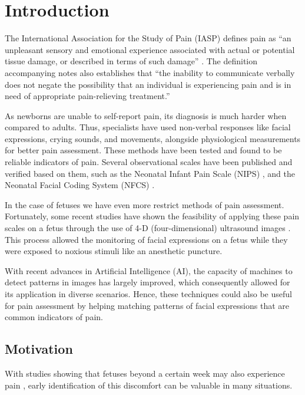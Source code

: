 \chapter{Introduction}

The International Association for the Study of Pain (IASP) defines pain as ``an unpleasant sensory and emotional experience associated with actual or potential tissue damage, or described in terms of such damage'' \citep{merskey1994classification}. The definition accompanying notes also establishes that ``the inability to communicate verbally does not negate the possibility that an individual is experiencing pain and is in need of appropriate pain-relieving treatment.''

As newborns are unable to self-report pain, its diagnosis is much harder when compared to adults. Thus, specialists have used non-verbal responses like facial expressions, crying sounds, and movements, alongside physiological measurements for better pain assessment. These methods have been tested and found to be reliable indicators of pain. Several observational scales have been published and verified based on them, such as the Neonatal Infant Pain Scale (NIPS) \citep{Lawrence1993}, and the Neonatal Facial Coding System (NFCS) \citep{Grunau1998}.

In the case of fetuses we have even more restrict methods of pain assessment. Fortunately, some recent studies have shown the feasibility of applying these pain scales on a fetus through the use of 4-D (four-dimensional) ultrasound images \citep{bernardes2018feasibility}. This process allowed the monitoring of facial expressions on a fetus while they were exposed to noxious stimuli like an anesthetic puncture.

With recent advances in Artificial Intelligence (AI), the capacity of machines to detect patterns in images has largely improved, which consequently allowed for its application in diverse scenarios. Hence, these techniques could also be useful for pain assessment by helping matching patterns of facial expressions that are common indicators of pain.

\section{Motivation}

With studies showing that fetuses beyond a certain week may also experience pain \citep{Derbyshire2006, Derbyshire2020}, early identification of this discomfort can be valuable in many situations. 

